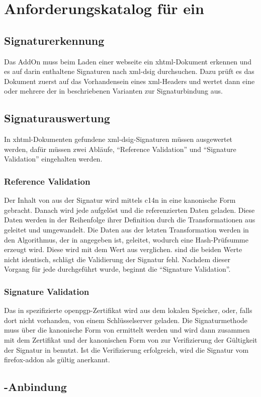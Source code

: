 
\chapter{Anforderungskatalog für ein \protect{}}
\label{chap:Anforderungskatalog}

\section{Signaturerkennung}
\label{sec:Anforderungskatalog:Signaturerkennung}
Das AddOn muss beim Laden einer \gls{webseite} ein \gls{xhtml}-Dokument erkennen und es auf darin enthaltene Signaturen nach \gls{xml-dsig}
durchsuchen. Dazu prüft es das Dokument zuerst auf das Vorhandensein eines \gls{xml}-Headers und wertet dann eine oder mehrere der in
 beschriebenen Varianten zur Signaturbindung aus.

\section{Signaturauswertung}
\label{sec:Anforderungskatalog:Signaturauswertung}
In \gls{xhtml}-Dokumenten gefundene \gls{xml-dsig}-Signaturen müssen ausgewertet werden, dafür müssen zwei Abläufe, "`Reference Validation"' und "`Signature
Validation"' eingehalten werden.

\subsection{Reference Validation}
Der Inhalt von  aus der Signatur wird mittels \gls{c14n} in eine kanonische Form gebracht. Danach wird jede  aufgelöst
und die referenzierten Daten geladen. Diese Daten werden in der Reihenfolge ihrer Definition durch die Transformationen aus  geleitet und
umgewandelt. Die Daten aus der letzten Transformation werden in den Algorithmus, der in  angegeben ist, geleitet, wodurch eine
Hash-Prüfsumme erzeugt wird. Diese wird mit dem Wert aus  verglichen. sind die beiden Werte nicht identisch, schlägt die Validierung der
Signatur fehl. Nachdem dieser Vorgang für jede  durchgeführt wurde, beginnt die "`Signature Validation"'.

\subsection{Signature Validation}
Das in  spezifizierte \gls{openpgp}-Zertifikat wird aus dem lokalen Speicher, oder, falls dort nicht vorhanden, von einem Schlüsselserver
geladen. Die Signaturmethode muss über die kanonische Form von  ermittelt werden und wird dann zusammen mit dem Zertifikat und der
kanonischen Form von  zur Verifizierung der Gültigkeit der Signatur in  benutzt. Ist die Verifizierung erfolgreich,
wird die Signatur vom \gls{firefox-addon} als gültig anerkannt.

\section{\protect{}-Anbindung}
\label{sec:Anforderungskatalog:GnuPG-Anbindung}

